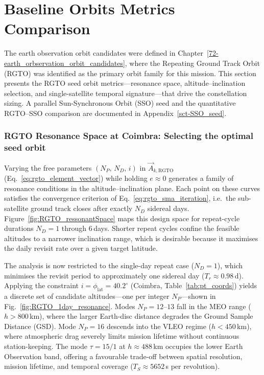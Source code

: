 \section{Baseline Orbits Metrics Comparison}
\label{chp:baslie_orbit_metrics}

The earth observation orbit candidates were defined in Chapter~\ref{72-earth_orbservation_orbit_candidates}, where the Repeating Ground Track Orbit (RGTO) was identified as the primary orbit family for this mission.  This section presents the RGTO seed orbit metrics---resonance space, altitude--inclination selection, and single-satellite temporal signature---that drive the constellation sizing.  A parallel Sun-Synchronous Orbit (SSO) seed and the quantitative RGTO--SSO comparison are documented in Appendix~\ref{sct-SSO_seed}.

\subsubsection{RGTO Resonance Space at Coimbra: Selecting the optimal seed orbit}
\label{sec:rgto_resonance_space_coimbra}

Varying the free parameters $(N_P,\, N_D,\, i)$ in $\vec{A}_{k,\mathrm{RGTO}}$ (Eq.~\eqref{eq:rgto_element_vector}) while holding $e \approx 0$ generates a family of resonance conditions in the altitude--inclination plane.  Each point on these curves satisfies the convergence criterion of Eq.~\eqref{eq:rgto_sma_iteration}, i.e.\ the sub-satellite ground track closes after exactly $N_D$ sidereal days.  Figure~\ref{fig:RGTO_ressonantSpace} maps this design space for repeat-cycle durations $N_D = 1$ through $6$\,days.  Shorter repeat cycles confine the feasible altitudes to a narrower inclination range, which is desirable because it maximises the daily revisit rate over a given target latitude.

The analysis is now restricted to the single-day repeat case ($N_D = 1$), which minimises the revisit period to approximately one sidereal day ($T_r \approx 0.98$\,d).  Applying the constraint $i = \phi_{\text{lat}} = 40.2^{\circ}$ (Coimbra, Table~\ref{tab:pt_coords}) yields a discrete set of candidate altitudes---one per integer $N_P$---shown in Fig.~\ref{fig:RGTO_1day_resonance}.  Modes $N_P = 12$--$13$ fall in the MEO range ($h > 800$\,km), where the larger Earth-disc distance degrades the Ground Sample Distance (GSD).  Mode $N_P = 16$ descends into the VLEO regime ($h < 450$\,km), where atmospheric drag severely limits mission lifetime without continuous station-keeping.  The mode $\tau = 15/1$ at $h \approx 488$\,km occupies the lower Earth Observation band, offering a favourable trade-off between spatial resolution, mission lifetime, and temporal coverage ($T_S \approx 5652$\,s per revolution).

